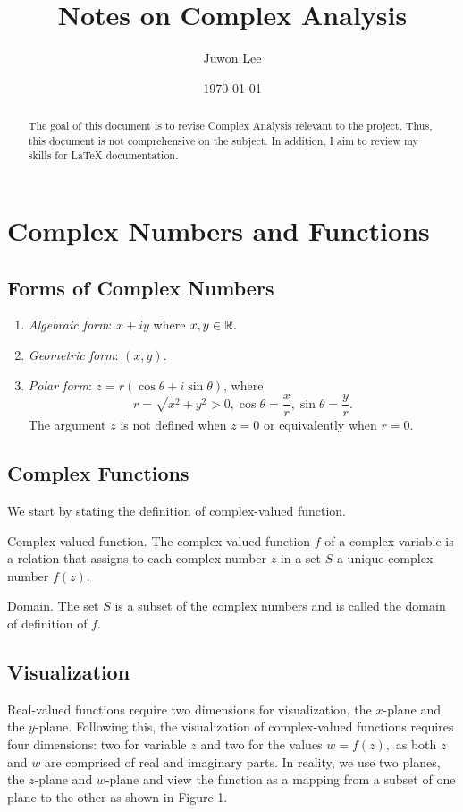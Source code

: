 \documentclass[11pt,reqno,oneside,a4paper]{article}
\author{Juwon Lee}
\title{Notes on Complex Analysis}
\date{\today}
\begin{document}
\maketitle
\thispagestyle{fancy}

\begin{abstract}
The goal of this document is to revise Complex Analysis relevant to the project. Thus, this document is not comprehensive on the subject. In addition, I aim to review my skills for LaTeX documentation. 
\end{abstract}

\section{Complex Numbers and Functions}

\subsection{Forms of Complex Numbers}
\begin{enumerate}
	\item \emph{Algebraic form}: $x + iy$ where $x,y \in \mathbb R.$ 
	\item \emph{Geometric form}: $(x,y)$.
	\item \emph{Polar form}: $z =r(\cos\theta + i\sin\theta)$, where $$r = \sqrt{x^2+y^2} > 0, \cos \theta = \frac{x}{r}, \sin \theta = \frac{y}{r}.$$ 
The argument $z$ is not defined when $z=0$ or equivalently when $r=0.$
\end{enumerate}


\subsection{Complex Functions}
We start by stating the definition of complex-valued function.

\begin{defn}{Complex-valued function.}
The complex-valued function $f$ of a complex variable is a relation that assigns to each complex number $z$ in a set $S$ a unique complex number $f(z).$ 
\end{defn}

\begin{defn}{Domain.}
The set $S$ is a subset of the complex numbers and is called the domain of definition of $f.$ 
\end{defn}

\subsection{Visualization}
Real-valued functions require two dimensions for visualization, the $x$-plane and the $y$-plane. 
Following this, the visualization of complex-valued functions requires four dimensions: two for variable $z$ and two for the values $w=f(z),$ as both $z$ and $w$ are comprised of real and imaginary parts. 
In reality, we use two planes, the $z$-plane and $w$-plane and view the function as a mapping from a subset of one plane to the other as shown in Figure 1.
\end{document}
